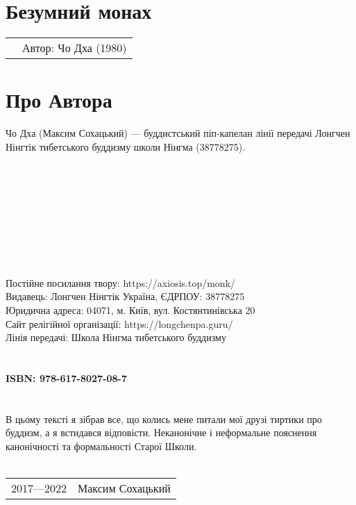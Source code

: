\section*{Безумний монах \dharmachakra}

\begin{tabular}{ll}
& Автор: Чо Дха (1980)\\
\end{tabular}

\section*{Про Автора}
Чо Дха (Максим Сохацький) --- буддистський піп-капелан лінії передачі
Лонгчен Нінгтік тибетського буддизму школи Нінгма (38778275).
\\
\\
\\
\\
\\
\\
\\
\\
\\
\\
Постійне посилання твору: https://axiosis.top/monk/ \\
Видавець: Лонгчен Нінгтік Україна, ЄДРПОУ: 38778275 \\
Юридична адреса: 04071, м. Київ, вул. Костянтинівська 20 \\
Сайт релігійної організації: https://longchenpa.guru/ \\
Лінія передачі: Школа Нінгма тибетського буддизму \\
\\
\\
{\bf ISBN: 978-617-8027-08-7 \hspace{2em}} \\
\\
\\
\indent В цьому тексті я зібрав все, що колись мене
питали мої друзі тиртики про буддизм, а я встидався відповісти.
Неканонічне і неформальне пояснення канонічності та формальності Старої Школи.
\\
\\
\begin{tabular}{ll}
\textcopyright{} 2017---2022 & Максим Сохацький
\end{tabular}
